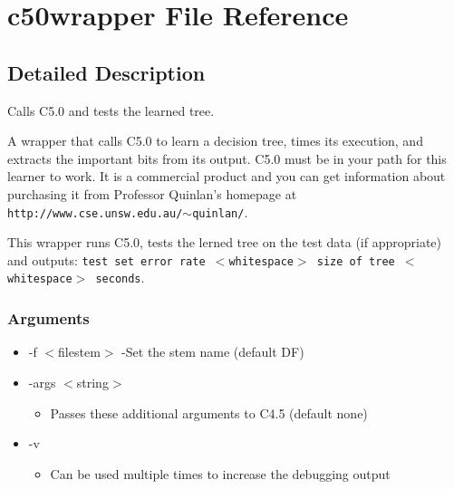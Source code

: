 \section{c50wrapper File Reference}
\label{c50wrapper}


\subsection{Detailed Description}
Calls C5.0 and tests the learned tree. 

A wrapper that calls C5.0 to learn a decision tree, times its execution, and extracts the important bits from its output. C5.0 must be in your path for this learner to work. It is a commercial product and you can get information about purchasing it from Professor Quinlan's homepage at {\tt http://www.cse.unsw.edu.au/$\sim$quinlan/}.

This wrapper runs C5.0, tests the lerned tree on the test data (if appropriate) and outputs: {\tt test set error rate $<$whitespace$>$ size of tree $<$whitespace$>$ seconds}.

\subsubsection*{Arguments}

\begin{itemize}
\item -f $<$filestem$>$ -Set the stem name (default DF)\item -args $<$string$>$\begin{itemize}
\item Passes these additional arguments to C4.5 (default none)\end{itemize}
\item -v\begin{itemize}
\item Can be used multiple times to increase the debugging output\end{itemize}
\end{itemize}


